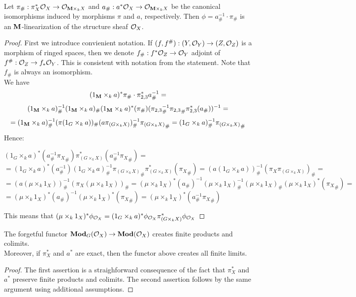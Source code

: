 \begin{proposition}\label{proposition:canonical linearization of the structure sheaf}
Let $\pi_{\#}:\pi^*_X{\mathcal O}_X \rightarrow {\mathcal O}_{\mathbf{M} \times_kX}$ and $a_{\#}:a^*{\mathcal O}_X \rightarrow {\mathcal O}_{\mathbf{M} \times_k X}$ be the canonical isomorphisms induced by morphisms $\pi$ and $a$, respectively. Then $\phi  = a_{\#}^{-1}\cdot {\pi}_{\#}$ is an $\mathbf{M}$-linearization of the structure sheaf ${\mathcal O}_X$.
\end{proposition}
\begin{proof}
First we introduce convienient notation. If $(f,f^{\#}):(Y,{\mathcal O}_Y)\rightarrow (Z,{\mathcal O}_Z)$ is a morphism of ringed spaces, then we denote $f_{\#}:f^*{\mathcal O}_Z\rightarrow {\mathcal O}_Y$ adjoint of $f^{\#}:{\mathcal O}_Z\rightarrow f_*{\mathcal O}_Y$. This is consistent with notation from the statement. Note that $f_{\#}$ is always an isomorphism.\\
We have
$$(1_{\mathbf{M}} \times_k a)^*\pi_{\#} \cdot \pi_{2,3}^*a_{\#}^{-1} =$$
$$(1_{\mathbf{M}} \times_ka)_{\#}^{-1}(1_{\mathbf{M}} \times_ka)_{\#}(1_{\mathbf{M}} \times_ka)^*({\pi}_{\#})({\pi_{2,3}}_{\#}^{-1}{\pi_{2,3}}_{\#}\pi_{2,3}^*(a_{\#}))^{-1}= $$ $$=(1_{\mathbf{M}}\times_k a)_{\#}^{-1}(\pi(1_G\times_ka))_{\#}(a\pi_{(G\times_kX)})_{\#}^{-1}{\pi_{(G\times_kX)}}_{\#}=(1_G\times_ka)_{\#}^{-1}{\pi_{(G\times_kX)}}_{\#}$$
Hence:
\begin{center}
$(1_G\times_ka)^*(a_{\#}^{-1}{\pi_X}_{\#})\pi_{(G\times_kX)}^*(a_{\#}^{-1}{\pi_X}_{\#})=$\\$=(1_G\times_ka)^*(a_{\#}^{-1})(1_G\times_ka)_{\#}^{-1}{\pi_{(G\times_kX)}}_{\#}\pi_{(G\times_kX)}^*({\pi_X}_{\#})=(a(1_G\times_ka))_{\#}^{-1}(\pi_X\pi_{(G\times_kX)})_{\#}=$\\$=(a(\mu\times_k1_X))^{-1}_{\#}(\pi_X(\mu\times_k1_X))_{\#}=(\mu\times_k1_X)^*(a_{\#})^{-1}(\mu\times_k1_X)^{-1}_{\#}(\mu\times_k1_X)_{\#}(\mu\times_k1_X)^*({\pi_X}_{\#})=$\\$=(\mu\times_k1_X)^*(a_{\#})^{-1}(\mu\times_k1_X)^*({\pi_X}_{\#})=(\mu\times_k1_X)^*(a_{\#}^{-1}{\pi_X}_{\#})$
\end{center}
This means that $(\mu\times_k1_X)^*\phi_{{\mathcal O}_X}=(1_G\times_k a)^*\phi_{{\mathcal O}_X}\pi_{(G\times_kX)}^*\phi_{{\mathcal O}_X}$
\end{proof}

\begin{proposition}
The forgetful functor $\mathbf{Mod}_G({\mathcal O}_X)\rightarrow \mathbf{Mod}({\mathcal O}_X)$ creates finite products and colimits.\\
Moreover, if $\pi^*_X$ and $a^*$ are exact, then the functor above creates all finite limits.
\end{proposition}
\begin{proof}
The first assertion is a straighforward consequence of the fact that $\pi_X^*$ and $a^*$ preserve finite products and colimits. The second assertion follows by the same argument using additional assumptions. 
\end{proof}

